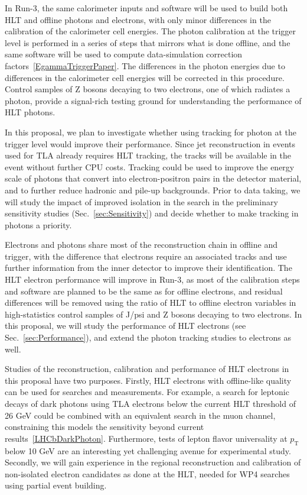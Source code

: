 In Run-3, the same calorimeter inputs and software will be used to build both HLT and offline photons and electrons, with only minor differences in the calibration of the calorimeter cell energies. The photon calibration at the trigger level is performed in a series of steps that mirrors what is done offline, and the same software will be used to compute data-simulation correction factors~\ref{EgammaTriggerPaper}. The differences in the photon energies due to differences in the calorimeter cell energies will be corrected in this procedure. Control samples of Z bosons decaying to two electrons, one of which radiates a photon, provide a signal-rich testing ground for understanding the performance of HLT photons.  

In this proposal, we plan to investigate whether using tracking for photon at the trigger level would improve their performance. Since jet reconstruction in events used for TLA already requires HLT tracking, the tracks will be available in the event without further CPU costs. Tracking could be used to improve the energy scale of photons that convert into electron-positron pairs in the detector material, and to further reduce hadronic and pile-up backgrounds. Prior to data taking, we will study the impact of improved isolation in the search in the preliminary sensitivity studies (Sec.~\ref{sec:Sensitivity}) and decide whether to make tracking in photons a priority. 

Electrons and photons share most of the reconstruction chain in offline and trigger, with the difference that electrons require an associated tracks and use further information from the inner detector to improve their identification. The HLT electron performance will improve in Run-3, as most of the calibration steps and software are planned to be the same as for offline electrons, and residual differences will be removed using the ratio of HLT to offline electron variables in high-statistics control samples of J/psi and Z bosons decaying to two electrons. 
In this proposal, we will study the performance of HLT electrons (see Sec.~\ref{sec:Performance}), and extend the photon tracking studies to electrons as well.

Studies of the reconstruction, calibration and performance of HLT electrons in this proposal have two purposes. 
Firstly, HLT electrons with offline-like quality can be used for searches and measurements. For example, a search for leptonic decays of dark photons using TLA electrons below the current HLT threshold of 26 GeV could be combined with an equivalent search in the muon channel, constraining this models the sensitivity beyond current results~\ref{LHCbDarkPhoton}. Furthermore, tests of lepton flavor universality at $p_{\mathrm{T}}$ below 10 GeV are an interesting yet challenging avenue for experimental study. 
Secondly, we will gain experience in the regional reconstruction and calibration of non-isolated electron candidates as done at the HLT, needed for WP4 searches using partial event building. 

